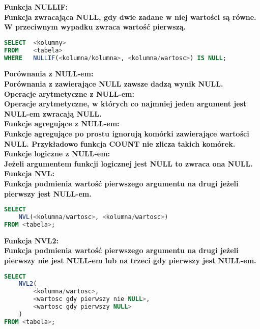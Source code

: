 \documentclass[a4paper,12pt]{article}
\newcommand{\h}[1]{\noindent \bf #1 \rm \\ \noindent}
\begin{document}
\h{Funkcja NULLIF:}
Funkcja zwracająca NULL, gdy dwie zadane w niej wartości są równe. W przeciwnym wypadku zwraca wartość pierwszą.
\begin{lstlisting}[language=SQL]
SELECT  <kolumny>
FROM    <tabela>
WHERE   NULLIF(<kolumna/kolumna>, <kolumna/wartosc>) IS NULL;
\end{lstlisting}
\vspace{5mm}

\h{Porównania z NULL-em:}
Porównania z zawierające NULL zawsze dadzą wynik NULL.\\

\h{Operacje arytmetyczne z NULL-em:}
Operacje arytmetyczne, w których co najmniej jeden argument jest NULL-em zwracają NULL.\\

\h{Funkcje agregujące z NULL-em:}
Funkcje agregujące po prostu ignorują komórki zawierające wartości NULL. Przykładowo funkcja COUNT nie zlicza takich komórek.\\

\h{Funkcje logiczne z NULL-em:}
Jeżeli argumentem funkcji logicznej jest NULL to zwraca ona NULL.\\

\newpage
\h{Funkcja NVL:}
Funkcja podmienia wartość pierwszego argumentu na drugi jeżeli pierwszy jest NULL-em.
\begin{lstlisting}[language=SQL]
SELECT 
	NVL(<kolumna/wartosc>, <kolumna/wartosc>) 
FROM <tabela>;
\end{lstlisting}
\vspace{5mm}

\h{Funkcja NVL2:}
Funkcja podmienia wartość pierwszego argumentu na drugi jeżeli pierwszy nie jest NULL-em lub na trzeci gdy pierwszy jest NULL-em.
\begin{lstlisting}[language=SQL]
SELECT 
	NVL2(
		<kolumna/wartosc>, 
		<wartosc gdy pierwszy nie NULL>,
		<wartosc gdy pierwszy NULL>
	) 
FROM <tabela>;
\end{lstlisting}
\vspace{5mm}
	
\end{document}
